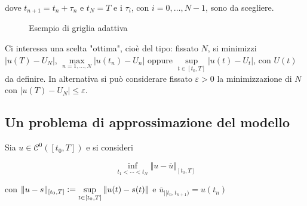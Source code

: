 \documentclass[hidelinks, 10pt]{report}
\begin{document}
dove $ t_{n + 1} = t_{n} + \tau_{n} $ e  $ t_{N} = T $ e i $ \tau_{i} $, con $ i = 0, \dotsc, N - 1 $, sono da scegliere.

\begin{center}
\begin{figure}[H]

\caption{Esempio di griglia adattiva}
\end{figure}
\end{center}

Ci interessa una scelta "ottima", cio\`e del tipo: fissato $ N $, si minimizzi $ {\vert u(T) - U_{N} \vert} $, $ {\max\limits_{n = 1, \dotsc, N} \vert u(t_{n}) - U_{n} \vert } $ oppure $ { \sup\limits_{t \in [t_{0}, T]} \vert u(t) - U_{t} \vert } $, con $ U(t) $ da definire. In alternativa si pu\`o considerare fissato $ \varepsilon > 0 $ la minimizzazione di $ N $ con $ { \vert u(T) - U_{N} \vert \le \varepsilon } $.

\subsection{Un problema di approssimazione del modello}
Sia $ u \in \mathcal{C}^{0} ([t_{0}, T]) $ e si consideri

\[ \inf\limits_{t_{1} < \dotsb < t_{N}} \Vert u - \overline{u} \Vert_{[t_{0}, T]} \]

con $ \Vert u - s \Vert_{[t_{0}, T]} \vcentcolon= \sup\limits_{t \in [t_{0}, T]} \Vert u(t) - s(t) \Vert $ e $ \overline{u}_{\big\vert [t_{n}, t_{n + 1})} = u(t_{n}) $
\end{document}
